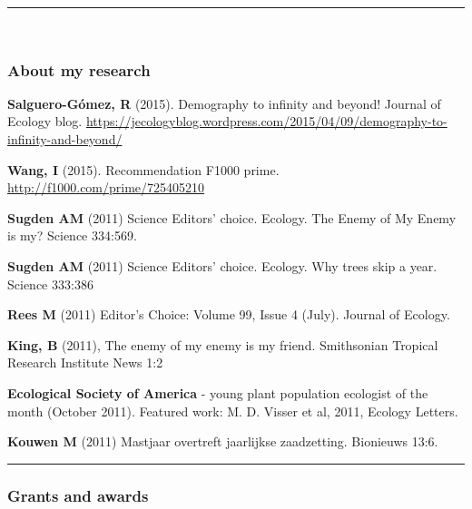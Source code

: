 \begin{center}\rule{0.5\linewidth}{\linethickness}\end{center}

~ ~ ~

\subsubsection{About my research}\label{about-my-research}

\begin{description}
\tightlist
\item[2015]
\textbf{Salguero-Gómez, R} (2015). Demography to infinity and beyond!
Journal of Ecology blog.
\url{https://jecologyblog.wordpress.com/2015/04/09/demography-to-infinity-and-beyond/}

\textbf{Wang, I} (2015). Recommendation F1000 prime.
\url{http://f1000.com/prime/725405210}
\item[2011]
\textbf{Sugden AM} (2011) Science Editors' choice. Ecology. The Enemy of
My Enemy is my? Science 334:569.

\textbf{Sugden AM} (2011) Science Editors' choice. Ecology. Why trees
skip a year. Science 333:386

\textbf{Rees M} (2011) Editor's Choice: Volume 99, Issue 4 (July).
Journal of Ecology.

\textbf{King, B} (2011), The enemy of my enemy is my friend. Smithsonian
Tropical Research Institute News 1:2

\textbf{Ecological Society of America} - young plant population
ecologist of the month (October 2011). Featured work: M. D. Visser et
al, 2011, Ecology Letters.

\textbf{Kouwen M} (2011) Mastjaar overtreft jaarlijkse zaadzetting.
Bionieuws 13:6.
\end{description}

\begin{center}\rule{0.5\linewidth}{\linethickness}\end{center}

\subsubsection{Grants and awards}\label{grants-and-awards}

